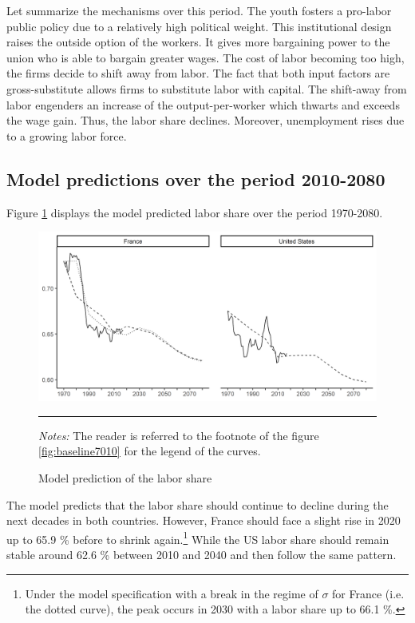 Let summarize the mechanisms over this period. The youth fosters a pro-labor public policy due to a relatively high political weight. This institutional design raises the outside option of the workers. It gives more bargaining power to the union who is able to bargain greater wages. The cost of labor becoming too high, the firms decide to shift away from labor. The fact that both input factors are gross-substitute allows firms to substitute labor with capital. The shift-away from labor engenders an increase of the output-per-worker which thwarts and exceeds the wage gain. Thus, the labor share declines. Moreover, unemployment rises due to a growing labor force.

\subsection{Model predictions over the period 2010-2080}

Figure \ref{fig:baseline1080} displays the model predicted labor share over the period 1970-2080.
\begin{figure}[tb]
	\centering
	\includegraphics[width=1\linewidth]{../result/baseline7080.png}
	\caption{Model prediction of the labor share}
	\label{fig:baseline1080}
	\vspace{.5ex}
	\hrule
	\vspace{-4ex}
	\justify\singlespacing\footnotesize \textit{Notes:} The reader is referred to the footnote of the figure \ref{fig:baseline7010} for the legend of the curves.
\end{figure}
The model predicts that the labor share should continue to decline during the next decades in both countries. However, France should face a slight rise in 2020 up to 65.9 \% before to shrink again.\footnote{Under the model specification with a break in the regime of $\sigma$ for France (i.e. the dotted curve), the peak occurs in 2030 with a labor share up to 66.1 \%.} While the US labor share should remain stable around 62.6 \% between 2010 and 2040 and then follow the same pattern.

